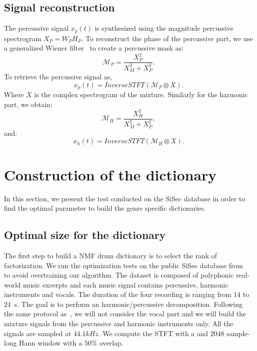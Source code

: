 \documentclass{article}
\begin{document}
 
\subsection{Signal reconstruction}

The percussive signal $x_p(t)$ is synthesized using the magnitude percussive spectrogram $X_P = W_PH_P$. To reconstruct the phase of the percussive part, we use a generalized Wiener filter~\cite{liutkus2015generalized} to create a percussive mask as:
\begin{equation}
\mathcal{M}_P = \frac{X_P^2}{X_M^2 + X_P^2}.
\end{equation} 
To retrieve the percussive signal as, 
\begin{equation}
x_p(t) = InverseSTFT(\mathcal{M}_P \otimes X).
\end{equation}
Where $X$ is the complex spectrogram of the mixture.
Similarly for the harmonic part, we obtain:
\begin{equation}\label{percuweiner}
\mathcal{M}_H = \frac{X_H^2}{X_M^2 + X_P^2},
\end{equation}
and:
\begin{equation}
x_h(t) = InverseSTFT(\mathcal{M}_H \otimes X).
\end{equation}




\section{Construction of the dictionary}

In this section, we present the test conducted on the SiSec database in order to find the optimal parameter to build the genre specific dictionaries. 

\subsection{Optimal size for the dictionary}\label{optimalsize}

The first step to build a NMF drum dictionary is to select the rank of factorization. We run the optimization tests on the public SiSec database from~\cite{SiSec10} to avoid overtraining our algorithm. The dataset is composed of polyphonic real-world music excerpts and each music signal contains percussive, harmonic instruments and vocals. The duration of the four recording is ranging from $14$ to $24$~s. The goal is to perform an harmonic/percussive decomposition. Following the same protocol as~\cite{canadas2014percussive}, we will not consider the vocal part and we will build the mixture signals from the percussive and harmonic instruments only. All the signals are sampled at $44.1kHz$. We compute the STFT with a and $2048$ sample-long Hann window with a $50\%$ overlap.
\end{document}
